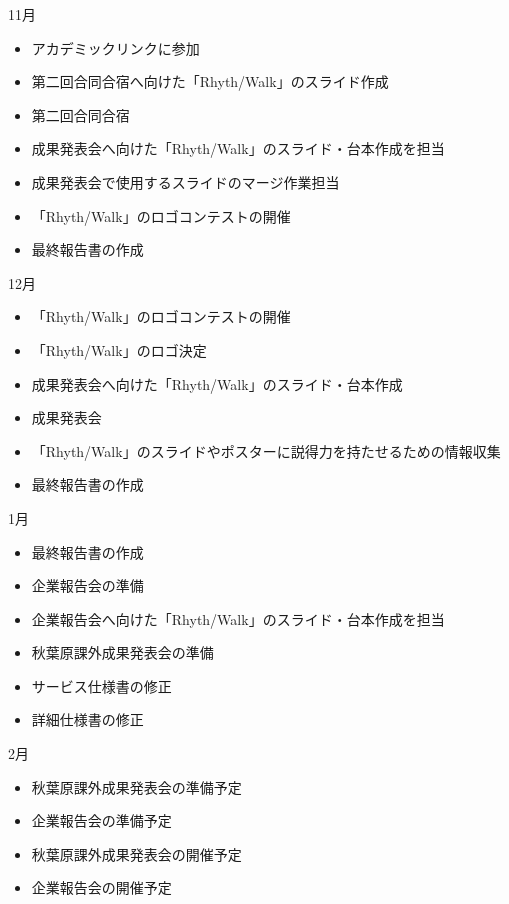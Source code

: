 11月
\begin{itemize}
\item アカデミックリンクに参加
\item 第二回合同合宿へ向けた「Rhyth/Walk」のスライド作成
\item 第二回合同合宿
\item 成果発表会へ向けた「Rhyth/Walk」のスライド・台本作成を担当
\item 成果発表会で使用するスライドのマージ作業担当
\item 「Rhyth/Walk」のロゴコンテストの開催
\item 最終報告書の作成
\end{itemize}
12月
\begin{itemize}
\item 「Rhyth/Walk」のロゴコンテストの開催
\item 「Rhyth/Walk」のロゴ決定
\item 成果発表会へ向けた「Rhyth/Walk」のスライド・台本作成
\item 成果発表会
\item 「Rhyth/Walk」のスライドやポスターに説得力を持たせるための情報収集
\item 最終報告書の作成
\end{itemize}
1月
\begin{itemize}
\item 最終報告書の作成
\item 企業報告会の準備
\item 企業報告会へ向けた「Rhyth/Walk」のスライド・台本作成を担当
\item 秋葉原課外成果発表会の準備
\item サービス仕様書の修正
\item 詳細仕様書の修正
\end{itemize}
2月
\begin{itemize}
\item 秋葉原課外成果発表会の準備予定
\item 企業報告会の準備予定
\item 秋葉原課外成果発表会の開催予定
\item 企業報告会の開催予定
\end{itemize}

